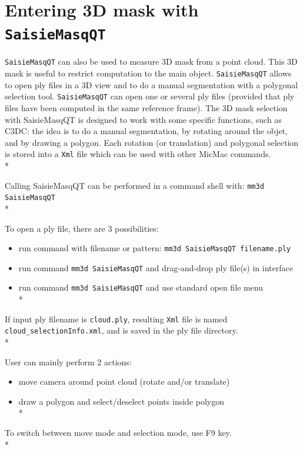 \section{Entering 3D mask with {\tt SaisieMasqQT} }

{\tt SaisieMasqQT} can also be used to measure 3D mask from a point cloud. This 3D mask is useful to restrict computation to the main object.
{\tt SaisieMasqQT} allows to open ply files in a 3D view and to do a manual segmentation with a polygonal selection tool.
{\tt SaisieMasqQT} can open one or several ply files (provided that ply files have been computed in the same reference frame).
The 3D mask selection with SaisieMasqQT is designed to work with some specific functions, such as C3DC: the idea is to do a manual segmentation,
by rotating around the objet, and by drawing a polygon.
Each rotation (or translation) and polygonal selection is stored into a {\tt Xml} file which can be used with other MicMac commands.\\*

Calling SaisieMasqQT can be performed in a command shell with: {\tt mm3d SaisieMasqQT}\\*

To open a ply file, there are 3 possibilities:
\begin{itemize}
\item run command with filename or pattern: {\tt mm3d SaisieMasqQT filename.ply}
\item run command {\tt mm3d SaisieMasqQT} and drag-and-drop ply file(s) in interface
\item run command {\tt mm3d SaisieMasqQT} and use standard open file menu\\*
\end{itemize}

If input ply filename is {\tt cloud.ply}, resulting {\tt Xml} file is named {\tt cloud\_selectionInfo.xml}, and is saved in the ply file directory.\\*

User can mainly perform 2 actions:
\begin{itemize}
\item move camera around point cloud (rotate and/or translate)
\item draw a polygon and select/deselect points inside polygon\\*
\end{itemize}

To switch between move mode and selection mode, use F9 key.\\*

